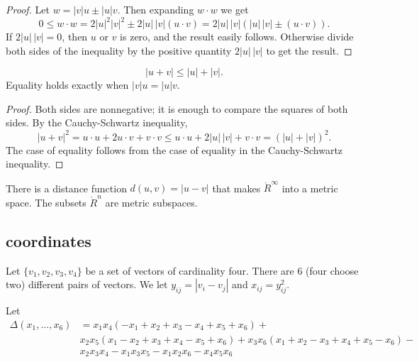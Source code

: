 \begin{proof}
   Let $w = |v| u \pm |u| v$.  Then expanding $w\cdot w$ we get
    $$0\le w\cdot w = 2|u|^2|v|^2 \pm 2|u|\, |v| (u\cdot v) =
    2|u|\,
    |v| (|u|\, |v| \pm (u \cdot v)).$$
    If $2|u| \,|v| = 0$, then $u$ or $v$ is zero, and the result
    easily follows.  Otherwise divide both sides of the inequality
    by the positive quantity $2 |u| \,|v|$ to get the result.
\end{proof}

\begin{lemma}
  $$
  |u + v| \le |u| + |v |.
  $$
Equality holds exactly when $|v|u = |u|v$.
\end{lemma}

\begin{proof}
Both sides are nonnegative; it is enough to compare the squares of
both sides.  By the Cauchy-Schwartz inequality,
    $$|u + v|^2 = u\cdot u + 2 u\cdot v + v\cdot v \le
      u\cdot u + 2 | u|\,|v| + v\cdot v = (|u|+|v|)^2.
    $$
The case of equality follows from the case of equality in the
Cauchy-Schwartz inequality.
\end{proof}

There is a distance function $d(u,v) = | u - v|$ that makes
$\ring{R}^\infty$ into a metric space.  The subsets $\ring{R}^n$ are
metric subspaces.






\subsection{coordinates}

Let $\{v_1,v_2,v_3,v_4\}$ be a set of vectors of cardinality four.
There are $6$ (four choose two) different pairs of vectors. We let
$y_{ij} = |v_i-v_j|$ and $x_{ij}=y_{ij}^2$.


\begin{definition}\label{def:delta}  Let 
$$
\begin{array}{lll}
\Delta(x_1,\ldots,x_6) &= x_1 x_4 (- x_1+x_2+x_3- x_4+x_5+x_6)+\\&
            x_2 x_5 (x_1- x_2+x_3+x_4- x_5+x_6)
            +x_3 x_6 (x_1+x_2- x_3+x_4+x_5- x_6)
            - \\&x_2 x_3 x_4- x_1 x_3 x_5- x_1 x_2 x_6- x_4 x_5 x_6
\end{array}
$$
\end{definition}

